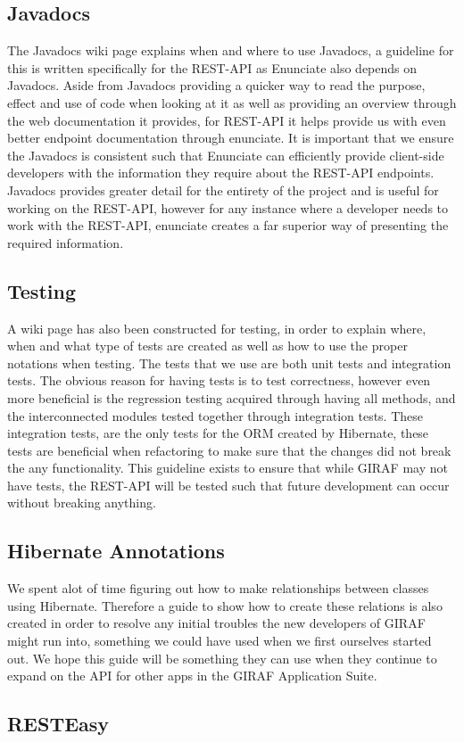 \subsection{Javadocs}
The Javadocs wiki page explains when and where to use Javadocs, a guideline for this is written specifically for the REST-API as Enunciate also depends on Javadocs.
Aside from Javadocs providing a quicker way to read the purpose, effect and use of code when looking at it as well as providing an overview through the web documentation it provides, for REST-API it helps provide us with even better endpoint documentation through enunciate.
It is important that we ensure the Javadocs is consistent such that Enunciate can efficiently provide client-side developers with the information they require about the REST-API endpoints.
Javadocs provides greater detail for the entirety of the project and is useful for working on the REST-API, however for any instance where a developer needs to work with the REST-API, enunciate creates a far superior way of presenting the required information.

\subsection{Testing}
A wiki page has also been constructed for testing, in order to explain where, when and what type of tests are created as well as how to use the proper notations when testing.
The tests that we use are both unit tests and integration tests.
The obvious reason for having tests is to test correctness, however even more beneficial is the regression testing acquired through having all methods, and the interconnected modules tested together through integration tests.
These integration tests, are the only tests for the ORM created by Hibernate, these tests are beneficial when refactoring to make sure that the changes did not break the any functionality.
This guideline exists to ensure that while GIRAF may not have tests, the REST-API will be tested such that future development can occur without breaking anything.

\subsection{Hibernate Annotations}
We spent alot of time figuring out how to make relationships between classes using Hibernate.
Therefore a guide to show how to create these relations is also created in order to resolve any initial troubles the new developers of GIRAF might run into, something we could have used when we first ourselves started out.
We hope this guide will be something they can use when they continue to expand on the API for other apps in the GIRAF Application Suite.

\subsection{RESTEasy}